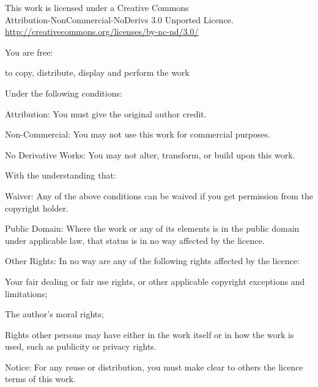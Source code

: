 
\thispagestyle{plain}

\vspace*{-2\onelineskip}
\enlargethispage{\onelineskip}

{\smaller\setlength{\parindent}{0pt}%
\raggedright\label{copyright-details}
\setlength{\parskip}{5pt}
{\centering

{\large\ccbyncnd}

This work is licensed under a Creative Commons\\
Attribution-NonCommercial-NoDerivs 3.0 Unported Licence.\\
\href{http://creativecommons.org/licenses/by-nc-nd/3.0/}{http://creativecommons.org/licenses/by-nc-nd/3.0/}

}

You are free:

\begin{packeditemize}
\item to copy, distribute, display and perform the work
\end{packeditemize}

Under the following conditions:

\begin{packeditemize}
\item Attribution: You must give the original author credit.
\item Non-Commercial: You may not use this work for commercial purposes.
\item No Derivative Works: You may not alter, transform, or build upon this work.
\end{packeditemize}

With the understanding that:

\begin{packeditemize}
\item Waiver: Any of the above conditions can be waived if you get permission from the copyright holder.
\item Public Domain: Where the work or any of its elements is in the public domain under applicable law, that status is in no way affected by the licence.
\item Other Rights: In no way are any of the following rights affected by the licence:
\begin{packeditemize}
\item Your fair dealing or fair use rights, or other applicable copyright exceptions and limitations;
\item The author's moral rights;
\item Rights other persons may have either in the work itself or in how the work is used, such as publicity or privacy rights.
\end{packeditemize}
\item Notice: For any reuse or distribution, you must make clear to others the licence terms of this work.
\end{packeditemize}

}
